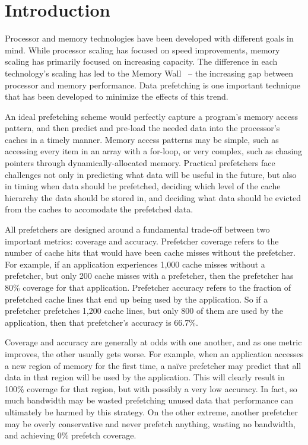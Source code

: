 \section{Introduction}
\label{Introduction}

Processor and memory technologies have been developed with different
goals in mind.  While processor scaling has focused on speed improvements,
memory scaling has primarily focused on increasing capacity.  The
difference in each technology's scaling has led to the Memory Wall~\cite{MemWall}
-- the increasing gap between processor and memory performance. Data prefetching
is one important technique that has been developed to minimize the effects 
of this trend.


An ideal prefetching scheme would perfectly capture a program's memory access pattern, and then
predict and pre-load the needed data into the processor's caches in a timely manner. 
Memory access patterns may be simple, such as accessing every item in an array with a for-loop,
or very complex, such as chasing pointers through dynamically-allocated memory.
Practical prefetchers face challenges not only in predicting what data will be useful in the future,
but also in timing when data should be prefetched, deciding which level of the cache hierarchy
the data should be stored in, and deciding what data should be evicted from the caches to accomodate
the prefetched data.

All prefetchers are designed around a fundamental trade-off between two important metrics:
coverage and accuracy.  Prefetcher coverage refers to the number of cache hits that would have
been cache misses without the prefetcher.  For example, if an application experiences 1,000 cache misses
without a prefetcher, but only 200 cache misses with a prefetcher, then the prefetcher has 80\%
coverage for that application.  Prefetcher accuracy refers to the fraction of prefetched cache lines
that end up being used by the application.  So if a prefetcher prefetches 1,200 cache lines, 
but only 800 of them are used by the application, then that prefetcher's accuracy is 66.7\%.

Coverage and accuracy are generally at odds with one another, and as one metric improves, the other
usually gets worse.  For example, when an application accesses a new region of memory for the first
time, a na\"ive prefetcher may predict that all data in that region will be used by the application.
This will clearly result in 100\% coverage for that region, but with possibly a very low accuracy.
In fact, so much bandwidth may be wasted prefetching unused data that performance can ultimately be
harmed by this strategy.  On the other extreme, another prefetcher may be overly
conservative and never prefetch anything, wasting no bandwidth, and achieving 0\% prefetch
coverage.

